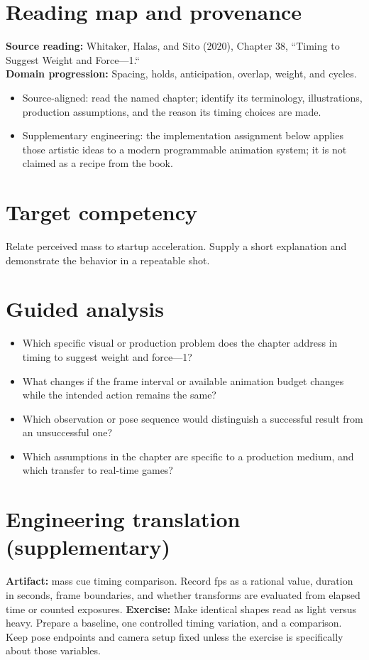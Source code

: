 \documentclass[10pt,letterpaper]{article}
\begin{document}
\makedoctitle
\makedocsummary

\section{Reading map and provenance}
\textbf{Source reading:} Whitaker, Halas, and Sito (2020), Chapter 38, ``Timing to Suggest Weight and Force—1.``\\
\textbf{Domain progression:} Spacing, holds, anticipation, overlap, weight, and cycles.
\begin{itemize}
\item Source-aligned: read the named chapter; identify its terminology, illustrations, production assumptions, and the reason its timing choices are made.
\item Supplementary engineering: the implementation assignment below applies those artistic ideas to a modern programmable animation system; it is not claimed as a recipe from the book.
\end{itemize}
\section{Target competency}
Relate perceived mass to startup acceleration. Supply a short explanation and demonstrate the behavior in a repeatable shot.
\section{Guided analysis}
\begin{itemize}
\item Which specific visual or production problem does the chapter address in timing to suggest weight and force—1?
\item What changes if the frame interval or available animation budget changes while the intended action remains the same?
\item Which observation or pose sequence would distinguish a successful result from an unsuccessful one?
\item Which assumptions in the chapter are specific to a production medium, and which transfer to real-time games?
\end{itemize}
\section{Engineering translation (supplementary)}
\textbf{Artifact:} mass cue timing comparison. Record fps as a rational value, duration in seconds, frame boundaries, and whether transforms are evaluated from elapsed time or counted exposures.
\textbf{Exercise:} Make identical shapes read as light versus heavy. Prepare a baseline, one controlled timing variation, and a comparison. Keep pose endpoints and camera setup fixed unless the exercise is specifically about those variables.
\end{document}
